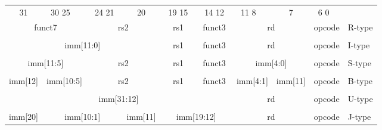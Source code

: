 \documentclass[14pt, russian, onesize]{extreport}
\begin{document}
\newcommand{\instbit}[1]{\mbox{\scriptsize #1}}
\newcommand{\instbitrange}[2]{~\instbit{#1} \hfill \instbit{#2}~}
\begin{figure}[h]
\begin{small} \begin{center} \setlength{\tabcolsep}{4pt} \begin{tabular}{p{0.3in}@{}p{0.8in}@{}p{0.6in}@{}p{0.18in}@{}p{0.7in}@{}p{0.6in}@{}p{0.6in}@{}p{0.3in}@{}p{0.5in}l} \\ \multicolumn{1}{c}{\instbit{31}} & \instbitrange{30}{25} & \instbitrange{24}{21} & \multicolumn{1}{c}{\instbit{20}} & \instbitrange{19}{15} & \instbitrange{14}{12} & \instbitrange{11}{8} & \multicolumn{1}{c}{\instbit{7}} & \instbitrange{6}{0} \\ \cline{1-9} \multicolumn{2}{|c|}{funct7} & \multicolumn{2}{c|}{rs2} & \multicolumn{1}{c|}{rs1} & \multicolumn{1}{c|}{funct3} & \multicolumn{2}{c|}{rd} & \multicolumn{1}{c|}{opcode} & R-type \\ \cline{1-9} \\ \cline{1-9} \multicolumn{4}{|c|}{imm[11:0]} & \multicolumn{1}{c|}{rs1} & \multicolumn{1}{c|}{funct3} & \multicolumn{2}{c|}{rd} & \multicolumn{1}{c|}{opcode} & I-type \\ \cline{1-9} \\ \cline{1-9} \multicolumn{2}{|c|}{imm[11:5]} & \multicolumn{2}{c|}{rs2} & \multicolumn{1}{c|}{rs1} & \multicolumn{1}{c|}{funct3} & \multicolumn{2}{c|}{imm[4:0]} & \multicolumn{1}{c|}{opcode} & S-type \\ \cline{1-9} \\ \cline{1-9} \multicolumn{1}{|c|}{imm[12]} & \multicolumn{1}{c|}{imm[10:5]} & \multicolumn{2}{c|}{rs2} & \multicolumn{1}{c|}{rs1} & \multicolumn{1}{c|}{funct3} & \multicolumn{1}{c|}{imm[4:1]} & \multicolumn{1}{c|}{imm[11]} & \multicolumn{1}{c|}{opcode} & B-type \\ \cline{1-9} \\ \cline{1-9} \multicolumn{6}{|c|}{imm[31:12]} & \multicolumn{2}{c|}{rd} & \multicolumn{1}{c|}{opcode} & U-type \\ \cline{1-9} \\ \cline{1-9} \multicolumn{1}{|c|}{imm[20]} & \multicolumn{2}{c|}{imm[10:1]} & \multicolumn{1}{c|}{imm[11]} & \multicolumn{2}{c|}{imm[19:12]} & \multicolumn{2}{c|}{rd} & \multicolumn{1}{c|}{opcode} & J-type \\ \cline{1-9} \end{tabular} \end{center} \end{small}  \label{fig:baseinstformatsimm}
\end{figure}
\end{document}
